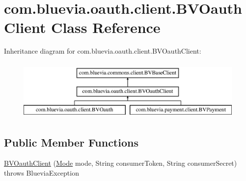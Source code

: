 \hypertarget{classcom_1_1bluevia_1_1oauth_1_1client_1_1BVOauthClient}{
\section{com.bluevia.oauth.client.BVOauthClient Class Reference}
\label{classcom_1_1bluevia_1_1oauth_1_1client_1_1BVOauthClient}
}
Inheritance diagram for com.bluevia.oauth.client.BVOauthClient:\begin{figure}[H]
\begin{center}
\leavevmode
\includegraphics[height=3.000000cm]{classcom_1_1bluevia_1_1oauth_1_1client_1_1BVOauthClient}
\end{center}
\end{figure}
\subsection*{Public Member Functions}
\begin{DoxyCompactItemize}
\item 
\hyperlink{classcom_1_1bluevia_1_1oauth_1_1client_1_1BVOauthClient_a592703e803c53c68243a31d138df70ad}{BVOauthClient} (\hyperlink{classcom_1_1bluevia_1_1commons_1_1client_1_1BVBaseClient_a5f4a4a27d73a8ddd0ce450a6c7a4d1b7}{Mode} mode, String consumerToken, String consumerSecret)  throws BlueviaException 
\end{DoxyCompactItemize}
